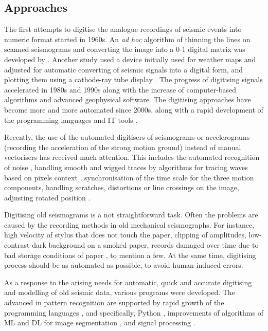 \documentclass[informatics,article,submit,moreauthors,pdftex]{Definitions/mdpi}
\begin{document}
\subsection{Approaches}
The first attempts to digitise the analogue recordings of seismic events into numeric format started in 1960s. An \emph{ad hoc} algorithm of thinning the lines on scanned seismograms and converting the image into a 0-1 digital matrix was developed by \cite{Jarosch1975}. Another study used a device initially used for weather maps and adjusted for automatic converting of seismic signals into a digital form, and plotting them using a cathode-ray tube display \cite{AdamsAllen1961}. The progress of digitising signals accelerated in 1980s \citep{AspinallLatchman,CrouseMatuschka1983} and 1990s \citep{Scherbaum1996a,NorlundGriffiths1993,McGee1995,Harjesetal1993,Scherbaum1996b,Scherbaum1996c} along with the increase of computer-based algorithms and advanced geophysical software. The digitising approaches have become more and more automated since 2000s, along with a rapid development of the programming languages and IT tools \cite{Bietal2016,Ishiietal2015,Schenke,Wangetal2014}. 
 
Recently, the use of the automated digitisers of seismograms or accelerograms (recording the acceleration of the strong motion ground) instead of manual vectorisers has received much attention. This includes the automated recognition of noise \cite{CrouseMatuschka1983}, handling smooth and wigged traces by algorithms for tracing waves based on pixels context \cite{Bietal2016}, synchronisation of the time scale for the three motion components, handling scratches, distortions or line crossings on the image, adjusting rotated position \cite{Trifunacetal1999}. 

Digitising old seismograms is a not straightforward task. Often the problems are caused by the recording methods in old mechanical seismographs. For instance, high velocity of stylus that does not touch the paper, clipping of amplitudes, low-contrast dark background on a smoked paper, records damaged over time due to bad storage conditions of paper \cite{Baskoutasetal2000}, to mention a few. At the same time, digitising process should be as automated as possible, to avoid human-induced errors. 

As a response to the arising needs for automatic, quick and accurate digitising and modelling of old seismic data, various programs were developed. The advanced in pattern recognition are supported by rapid growth of the programming languages \cite{Esmaili,analytica2030006,Lemenkova201991,Lemenkova2019100,Lemenkov202103}, and specifically, Python \cite{Cox,Stoneback, Lemenkova201989}, improvements of algorithms of \ac{ML} and \ac{DL} for image segmentation \cite{signals1010005,DebeirDecaestecker,signals2030037,Debeir2008}, and signal processing \cite{Foucart,Debeiretal2019}. 
\end{document}
